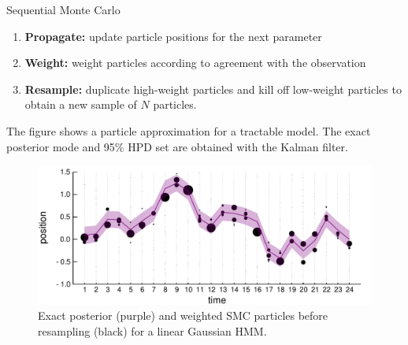 \documentclass[final, 12pt]{beamer}
\newlength{\colwidth}
\begin{document}
\begin{frame}
\begin{columns}
\begin{column}{\colwidth}
\begin{block}{Sequential Monte Carlo}
\begin{center}
\end{center}
\begin{enumerate}
\item \textbf{Propagate:} update particle positions for the next parameter
\item \textbf{Weight:} weight particles according to agreement with the observation
\item \textbf{Resample:} duplicate high-weight particles and kill off low-weight particles to obtain a new sample of $N$ particles.
\end{enumerate}

\vspace*{12pt}

The figure shows a particle approximation for a tractable model. The exact posterior mode and 95\% HPD set are obtained with the Kalman filter.
\begin{figure}
\includegraphics[width=\colwidth]{../smc_kalman_3.pdf}
\caption{Exact posterior (purple) and weighted SMC particles before resampling (black) for a linear Gaussian HMM.}
\end{figure}
\end{block}


\end{column}
\end{columns}
\end{frame}
\end{document}

